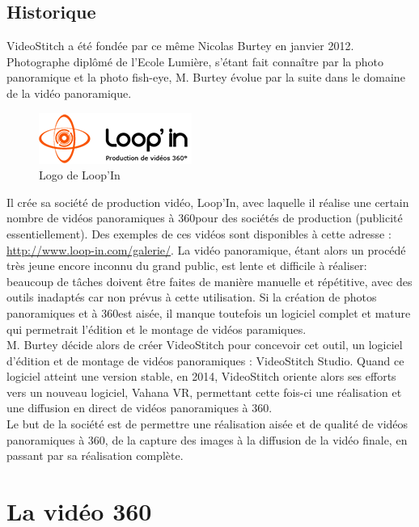 \subsection{Historique}
VideoStitch a été fondée par ce même Nicolas Burtey en janvier 2012.\\
Photographe diplômé de l'Ecole Lumière, s'étant fait connaître par la photo panoramique 
et la photo fish-eye, M. Burtey évolue par la suite dans le domaine de la vidéo panoramique.\\
\begin{figure}
  \centering
  \includegraphics[width=5cm]{images/loopin-logo.png}
  \caption{Logo de Loop'In}
\end{figure}
Il crée sa société de production vidéo, Loop'In, avec laquelle il réalise une 
certain nombre de vidéos panoramiques à 360\degree pour des sociétés de production (publicité essentiellement). 
Des exemples de ces vidéos sont disponibles à cette adresse : \url{http://www.loop-in.com/galerie/}.
La vidéo panoramique, étant alors un procédé très jeune encore inconnu du grand public, est 
lente et difficile à réaliser: beaucoup de tâches doivent être faites de manière 
manuelle et répétitive, avec des outils inadaptés car non prévus à cette utilisation.
Si la création de photos panoramiques et à 360\degree est aisée, il manque toutefois 
un logiciel complet et mature qui permetrait l'édition et le montage de vidéos paramiques.\\
\newline
M. Burtey décide alors de créer VideoStitch pour concevoir cet outil, un logiciel 
d'édition et de montage de vidéos panoramiques : VideoStitch Studio.
Quand ce logiciel atteint une version stable, en 2014, VideoStitch oriente alors 
ses efforts vers un nouveau logiciel, Vahana VR, permettant cette fois-ci une réalisation 
et une diffusion en direct de vidéos panoramiques à 360\degree.\\
Le but de la société est de permettre une réalisation aisée et de qualité de vidéos 
panoramiques à 360\degree, de la capture des images à la diffusion de la vidéo finale, 
en passant par sa réalisation complète.


\section{La vidéo 360}
